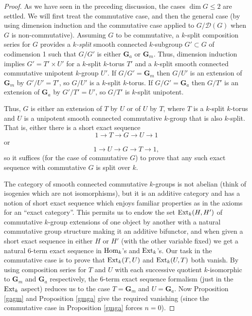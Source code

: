 \documentclass[10pt]{article}
\renewcommand{\(}{\left(}
\renewcommand{\)}{\right)}
\numberwithin{thm}{subsection}
\begin{document}
\begin{proof}
As we have seen in the preceding discussion, the cases $\dim G \le 2$ are settled.
We will first treat the commutative case, and then the general case
(by using dimension induction and the commutative case applied
to $G/\mathscr{D}(G)$ when $G$ is non-commutative).   
Assuming $G$ to be commutative, a $k$-split composition series for 
$G$ provides a {\em $k$-split} smooth connected
$k$-subgroup $G' \subset G$ of codimension 1 such that
$G/G'$ is either $\mathbf{G}_a$ or $\mathbf{G}_m$. 
Thus, dimension induction implies $G' = T' \times U'$
for a $k$-split $k$-torus $T'$ and a $k$-split smooth connected
commutative unipotent $k$-group $U'$.  
If $G/G' = \mathbf{G}_m$ then $G/U'$ is an extension of $\mathbf{G}_m$ by 
$G'/U' = T'$, so $G/U'$ is a $k$-split $k$-torus.  If 
$G/G' = \mathbf{G}_a$ then $G/T'$ is an extension of
$\mathbf{G}_a$ by $G'/T' = U'$, so $G/T'$ is $k$-split unipotent.

Thus, $G$ is either an extension of $T$ by $U$ or of $U$ by $T$,
where $T$ is a $k$-split $k$-torus and $U$ is a unipotent smooth
connected commutative $k$-group that is also $k$-split.   That is,
either there is a short exact sequence
$$1 \rightarrow T \rightarrow G \rightarrow U \rightarrow 1$$
or 
$$1 \rightarrow U \rightarrow G \rightarrow T \rightarrow 1,$$
so it suffices (for the case of commutative $G$) to prove
that any such exact sequence with commutative $G$ is split over $k$. 

The category of smooth connected commutative $k$-groups is not abelian
(think of isogenies which are not isomorphisms), but it is an additive category and
has a notion of short exact sequence which enjoys familiar properties as
in the axioms for an ``exact category''.  This permits us to endow
the set ${\rm{Ext}}_k(H,H')$ of commutative $k$-group extensions of
one object by another with a natural commutative group structure making
it an additive bifunctor, and when given a short exact sequence in
either $H$ or $H'$ (with the other variable fixed) we get a natural 6-term
exact sequence in ${\rm{Hom}}_k$'s and ${\rm{Ext}}_k$'s.
 Our task in the commutative case is to prove
that ${\rm{Ext}}_k(T,U)$ and ${\rm{Ext}}_k(U,T)$ both vanish.
By using composition series for $T$ and $U$ with each successive
quotient $k$-isomorphic to $\mathbf{G}_m$ and $\mathbf{G}_a$ respectively, 
the 6-term exact sequence formalism (just in the ${\rm{Ext}}_k$ aspect)
reduces us to the case
$T = \mathbf{G}_m$ and $U = \mathbf{G}_a$.
Now Proposition \ref{gagm} and Proposition \ref{gmga} give the required
vanishing (since the commutative case in Proposition \ref{gmga} forces $n = 0$). 


\end{proof}
\end{document}
